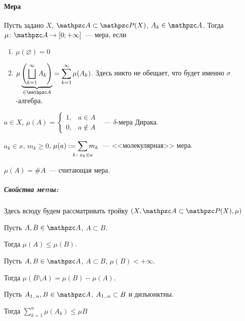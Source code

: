 \documentclass[12pt, timbord]{longnotes}
\begin{document}
\paragraph{Мера}
\label{par:meas::meas}

\begin{defn}\label{defn:meas::meas}
  Пусть задано $X$, $\alg \subset \pset (X)$, $A_k \in \alg$. Тогда $\mu \colon \alg \to [0;
  +\infty]$~--- мера, если 
  \begin{enumerate}
    \item $\mu(\varnothing) = 0$
    \item $\displaystyle\mu\underbrace{\left(\bigsqcup_{k=1}^\infty A_k\right)}_{\in \alg} 
      = \sum_{k=1}^\infty \mu(A_k)$. Здесь никто не обещает, что будет именно $\sigma$-алгебра.
  \end{enumerate}
\end{defn}

\begin{exmp}\label{exmp:meas::meas::delta}
  $a \in X$, $\displaystyle\mu(A) = \begin{cases}
    1, & a\in A \\
    0, & a \not\in A
  \end{cases}$ ~--- $\delta$-мера Дирака.
\end{exmp}
\begin{exmp}\label{exmp:meas::meas::mol}
  $a_k \in x$, $m_k \geqslant 0$, $\displaystyle\mu(a) := \sum_{\mathclap {k\colon a_k \in a}} m_k$~---
  <<молекулярная>> мера.
\end{exmp}

\begin{exmp}\label{exmp:meas::meas::cnt}
  $\mu(A) = \# A$~--- считающая мера. 
\end{exmp}

\subparagraph{Свойства меmы:}

Здесь всюду будем рассматривать тройку $(X, \alg \subset \pset (X), \mu)$

\begin{prop}\label{prop:meas::meas::monot}
  Пусть $A,B \in \alg$, $A \subset B$. \par Тогда $\mu(A) \leqslant \mu(B)$.
\end{prop}
\begin{prop}\label{prop:meas::meas::diff}
  Пусть $A,B \in \alg$, $A \subset B$, $\mu(B) < +\infty$.  \par 
  Тогда $ \mu(B\setminus A) = \mu(B) - \mu(A)$.
\end{prop}
\begin{prop}\label{prop:meas::meas::enfmont}
  Пусть $A_{1 \intrng n}, B \in \alg$, $A_{1 \mathbin{..} n} \subset B$ и дизъюнктны. \par
  Тогда $\displaystyle\sum_{k=1}^n \mu(A_k) \leqslant \mu B$
\end{prop}
\end{document}
